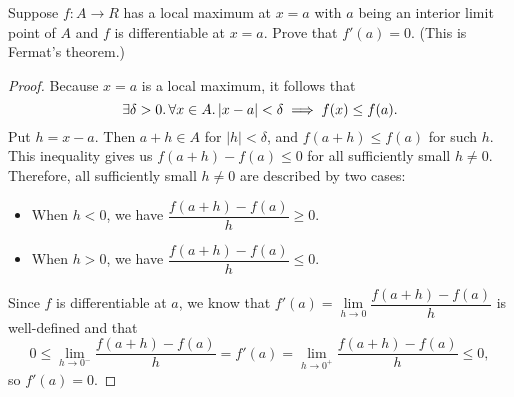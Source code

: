 \begin{problem}
  Suppose $f: A \to R$ has a local maximum at $x = a$ with $a$ being an
  interior limit point of $A$ and $f$ is differentiable at $x = a$.
  Prove that $f'(a) = 0$. (This is Fermat's theorem.)

  \begin{proof}
    Because $x = a$ is a local maximum, it follows that
    \[
      \exists \delta > 0.\, \forall x \in A. \left\lvert x - a \right\rvert < \delta \implies f(x) \leq f(a).
    \] 
    Put $h = x - a$. Then $a + h \in A$ for $|h| < \delta$, and $f(a + h) \leq f(a)$ for such $h$.
    This inequality gives us $f(a + h) - f(a) \leq 0$ for all sufficiently small $h \neq 0$.
    Therefore, all sufficiently small $h \neq 0$ are described by two cases:
    \begin{itemize}
      \item When $h < 0$, we have $\dfrac{f(a + h) - f(a)}{h} \geq 0$.
      \item When $h > 0$, we have $\dfrac{f(a + h) - f(a)}{h} \leq 0$.
    \end{itemize}

    Since $f$ is differentiable at $a$, we know that 
    $f'(a) = \lim\limits_{h \to 0} \dfrac{f(a + h) - f(a)}{h}$ is well-defined and that
    \[
      0 \leq \lim\limits_{h \to 0^{-}} \dfrac{f(a + h) - f(a)}{h} = f'(a) = \lim_{h \to 0^{+}} \frac{f(a + h) - f(a)}{h} \leq 0,
    \]
    so $f'(a) = 0$.
  \end{proof}

\end{problem}
